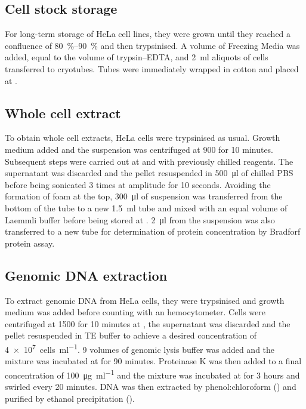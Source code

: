     \subsection{Cell stock storage}
      For long-term storage of HeLa cell lines, they were grown until
      they reached a confluence of \SIrange{80}{90}{\percent} and then
      trypsinised. A volume of Freezing Media was added, equal
      to the volume of trypsin--EDTA, and \SI{2}{\ml} aliquots of
      cells transferred to cryotubes. Tubes were immediately wrapped in
      cotton and placed at .

    \subsection{Whole cell extract}
      \label{sec:cell-extract}
      To obtain whole cell extracts, HeLa cells were trypsinised as usual. Growth
      medium added and the suspension was centrifuged at \SI{900}{\gn}
      for 10 minutes.
      Subsequent steps were carried out at  and with previously
      chilled reagents. The supernatant was discarded and the pellet
      resuspended in \SI{500}{\ul} of chilled PBS before being
      sonicated 3 times at  amplitude for 10 seconds. Avoiding the
      formation of foam at the top, \SI{300}{\ul} of suspension was transferred
      from the bottom of the tube to a new \SI{1.5}{\ml} tube
      and mixed with an equal
      volume of Laemmli buffer before being stored at .
      \SI{2}{\ul} from the suspension was also transferred to a new tube
      for determination of protein concentration by Bradforf protein assay.

    \subsection{Genomic DNA extraction}
      To extract genomic DNA from HeLa cells, they were trypsinised and
      growth medium was added before counting with an hemocytometer.
      Cells were centrifuged at \SI{1500}{\gn} for 10 minutes at , the
      supernatant was discarded
      and the pellet resuspended in TE buffer to achieve
      a desired concentration of \SI{4e7}{cells\per\ml}. 9 volumes of
      genomic lysis buffer was added
      and the mixture was incubated at  for
      90 minutes. Proteinase K was then added to a final concentration of
      \SI{100}{\ug\per\ml} and the mixture was
      incubated at  for 3 hours and
      swirled every 20 minutes. DNA was then extracted by
      phenol:chloroform () and purified by ethanol
      precipitation ().

